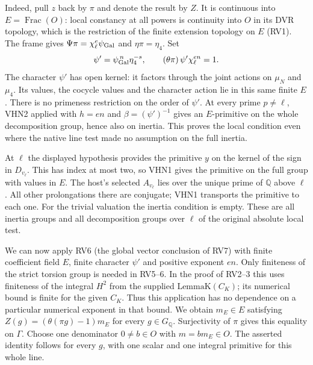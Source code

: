 Indeed, pull $z$ back by $\pi$ and denote the result by $Z$.
It is continuous into $E=\operatorname{Frac}(O)$: local constancy
at all powers is continuity into $O$ in its DVR topology, which
is the restriction of the finite extension topology on $E$ (RV1).
The frame gives $\Psi\pi=\chi_\ell^e\psi_{\rm Gal}$ and
$\eta\pi=\eta_4$. Set
\[
  \psi'=\psi_{\rm Gal}^{\,n}\eta_4^{-s},\qquad
             (\theta\pi)\,\psi'\chi_\ell^{en}=1 .
\]
The character $\psi'$ has open kernel: it factors through the
joint actions on $\mu_N$ and $\mu_4$. Its values, the cocycle
values and the character action lie in this same finite $E$.
There is no primeness restriction on the order of $\psi'$.
At every prime $p\ne\ell$, VHN2 applied with $h=en$ and
$\beta=(\psi')^{-1}$ gives an $E$-primitive on the whole
decomposition group, hence also on inertia. This proves the
local condition even where the native line test made no
assumption on the full inertia.

At $\ell$ the displayed hypothesis provides the primitive $y$ on
the kernel of the sign in $D_{v_\ell}$. This has index at most
two, so VHN1 gives the primitive on the full group with values
in $E$. The host's selected $A_{v_\ell}$ lies over the unique
prime of $\mathbb Q$ above $\ell$. All other prolongations there
are conjugate; VHN1 transports the primitive to each one. For
the trivial valuation the inertia condition is empty. These are
all inertia groups and all decomposition groups over $\ell$
of the original absolute local test.

We can now apply RV6 (the global vector conclusion of RV7) with
finite coefficient field $E$, finite character $\psi'$ and positive
exponent $en$. Only finiteness of the strict torsion group is
needed in RV5--6. In the proof of RV2--3 this uses finiteness
of the integral $H^2$ from the supplied $\mathrm{LemmaK}(C_K)$;
its numerical bound is finite for the given $C_K$. Thus this
application has no dependence on a particular numerical exponent
in that bound. We obtain $m_E\in E$ satisfying
$Z(g)=(\theta(\pi g)-1)m_E$ for every $g\in G_{\mathbb Q}$.
Surjectivity of $\pi$ gives this equality on $\Gamma$. Choose
one denominator $0\ne b\in O$ with $m=bm_E\in O$. The asserted
identity follows for every $g$, with one scalar and one integral
primitive for this whole line.

